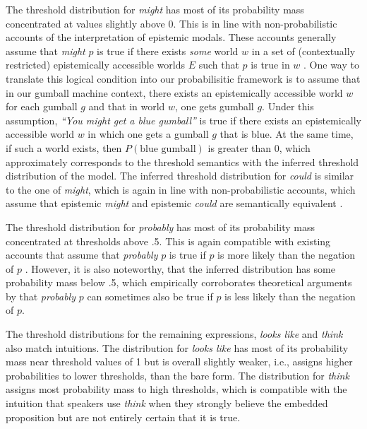 \documentclass[man, floatsintext]{apa6}
\begin{document}
The threshold distribution for \textit{might} has most of its probability mass concentrated at values slightly above 0. This 
is in line with non-probabilistic accounts of the interpretation of epistemic modals. These accounts generally assume that \textit{might} $p$ is true 
if there exists \textit{some} world $w$ in a set of (contextually restricted) epistemically accessible worlds $E$ such that $p$ is true in $w$ 
\parencite[e.g.,][]{Kratzer1991,Swanson2008,Hacquard2011}. One way to translate this logical condition into our probabilisitic framework is to assume that 
in our gumball machine context, there exists an epistemically accessible world $w$ for each gumball $g$ and that in world $w$, one gets gumball $g$. 
Under this assumption, \textit{``You might get a blue gumball''} is true if there exists an epistemically accessible world $w$  in which one gets a
gumball $g$ that is blue. At the same time, if such a world exists, then $P(\mbox{blue gumball})$ is greater than 0, which approximately corresponds
to the threshold semantics with the inferred threshold distribution of the model. The inferred threshold distribution for \textit{could} is similar to the one of \textit{might}, 
which is again in line with non-probabilistic accounts, which assume that epistemic \textit{might} and epistemic \textit{could} are semantically equivalent \parencite{Kratzer1991,Hacquard2011}.

The threshold distribution for \textit{probably} has most of its probability mass concentrated at thresholds above .5. This is again compatible with existing accounts that assume 
that \textit{probably} $p$ is true if $p$ is more likely than the negation of $p$ \parencite[e.g.,][]{Kratzer1991}. However, it is also noteworthy, that the inferred
distribution has some probability mass below .5, which empirically corroborates theoretical arguments by \textcite{Yalcin2010} that \textit{probably} $p$ can
sometimes also be true if $p$ is less likely than the negation of $p$.

The threshold distributions for the remaining expressions, \textit{looks like} and \textit{think} also match intuitions. The distribution for 
\textit{looks like} has most of its probability mass near threshold values of 1 but is overall slightly weaker, i.e., assigns higher probabilities to lower thresholds,
than the bare form. The distribution for \textit{think} assigns most probability mass to high thresholds, which is compatible with the intuition
that speakers use \textit{think} when they strongly believe the embedded proposition but are not entirely certain that it is true.
 
\end{document}
